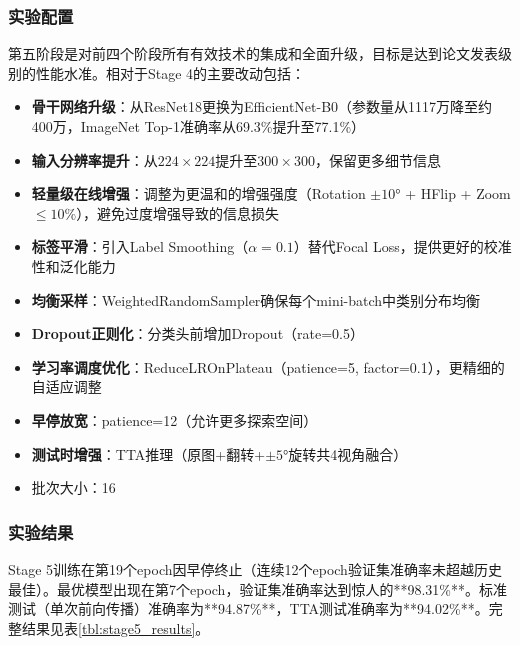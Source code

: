 \subsubsection{实验配置}

第五阶段是对前四个阶段所有有效技术的集成和全面升级，目标是达到论文发表级别的性能水准。相对于Stage 4的主要改动包括：

\begin{itemize}
    \item \textbf{骨干网络升级}：从ResNet18更换为EfficientNet-B0（参数量从1117万降至约400万，ImageNet Top-1准确率从69.3\%提升至77.1\%）
    \item \textbf{输入分辨率提升}：从$224\times224$提升至$300\times300$，保留更多细节信息
    \item \textbf{轻量级在线增强}：调整为更温和的增强强度（Rotation $\pm10°$ + HFlip + Zoom $\leq10\%$），避免过度增强导致的信息损失
    \item \textbf{标签平滑}：引入Label Smoothing（$\alpha=0.1$）替代Focal Loss，提供更好的校准性和泛化能力
    \item \textbf{均衡采样}：WeightedRandomSampler确保每个mini-batch中类别分布均衡
    \item \textbf{Dropout正则化}：分类头前增加Dropout（rate=0.5）
    \item \textbf{学习率调度优化}：ReduceLROnPlateau（patience=5, factor=0.1），更精细的自适应调整
    \item \textbf{早停放宽}：patience=12（允许更多探索空间）
    \item \textbf{测试时增强}：TTA推理（原图+翻转+$\pm5°$旋转共4视角融合）
    \item 批次大小：16
\end{itemize}

\subsubsection{实验结果}

Stage 5训练在第19个epoch因早停终止（连续12个epoch验证集准确率未超越历史最佳）。最优模型出现在第7个epoch，验证集准确率达到惊人的**98.31\%**。标准测试（单次前向传播）准确率为**94.87\%**，TTA测试准确率为**94.02\%**。完整结果见表\ref{tbl:stage5_results}。

